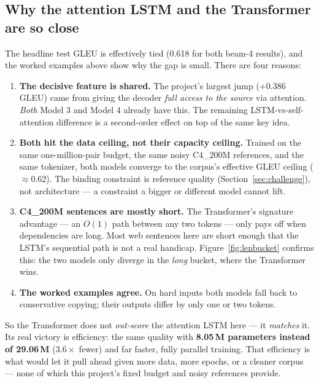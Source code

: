 \documentclass[11pt,a4paper]{article}
\begin{document}
\subsection{Why the attention LSTM and the Transformer are so close}
\label{sec:close}
The headline test GLEU is effectively tied (0.618 for both beam-4 results), and
the worked examples above show why the gap is small. There are four reasons:

\begin{enumerate}[noitemsep]
  \item \textbf{The decisive feature is shared.} The project's largest jump
        (+0.386 GLEU) came from giving the decoder \emph{full access to the
        source} via attention. \emph{Both} Model 3 and Model 4 already have
        this. The remaining LSTM-vs-self-attention difference is a
        second-order effect on top of the same key idea.
  \item \textbf{Both hit the data ceiling, not their capacity ceiling.} Trained
        on the same one-million-pair budget, the same noisy C4\_200M
        references, and the same tokenizer, both models converge to the
        corpus's effective GLEU ceiling ($\approx$0.62). The binding
        constraint is reference quality (Section~\ref{sec:challenge}), not
        architecture --- a constraint a bigger or different model cannot lift.
  \item \textbf{C4\_200M sentences are mostly short.} The Transformer's
        signature advantage --- an $O(1)$ path between any two tokens --- only
        pays off when dependencies are long. Most web sentences here are short
        enough that the LSTM's sequential path is not a real handicap.
        Figure~\ref{fig:lenbucket} confirms this: the two models only diverge
        in the \emph{long} bucket, where the Transformer wins.
  \item \textbf{The worked examples agree.} On hard inputs both models fall
        back to conservative copying; their outputs differ by only one or two
        tokens.
\end{enumerate}

So the Transformer does not \emph{out-score} the attention LSTM here --- it
\emph{matches} it. Its real victory is efficiency: the same quality with
\textbf{8.05\,M parameters instead of 29.06\,M} ($3.6\times$ fewer) and far
faster, fully parallel training. That efficiency is what would let it pull
ahead given more data, more epochs, or a cleaner corpus --- none of which this
project's fixed budget and noisy references provide.
\end{document}
